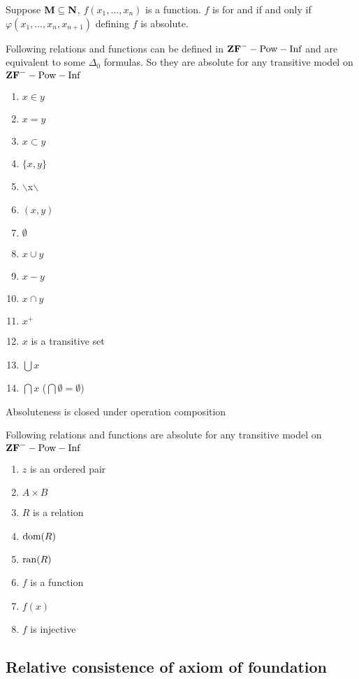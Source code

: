 \documentclass[11pt]{article}
\begin{document}
\begin{definition}[]
Suppose \(\textbf{M}\subseteq\textbf{N}\), \(f(x_1,\dots,x_n)\) is a function. \(f\) is
 for \cm and \cn if and only if \(\varphi(x_1,\dots,x_n,x_{n+1})\)
defining \(f\) is absolute.
\end{definition}

\begin{theorem}[]
Following relations and functions can be defined in
\(\textbf{ZF}^--\text{Pow}-\text{Inf}\) and are equivalent to some \(\Delta_0\) formulas.
So they are absolute for any transitive model \cm on 
\(\textbf{ZF}^--\text{Pow}-\text{Inf}\)
\begin{enumerate}
\item \(x\in y\)
\item \(x=y\)
\item \(x\subset y\)
\item \(\{x,y\}\)
\item $\backslash${x$\backslash$}
\item \((x,y)\)
\item \(\emptyset\)
\item \(x\cup y\)
\item \(x-y\)
\item \(x\cap y\)
\item \(x^+\)
\item \(x\) is a transitive set
\item \(\bigcup x\)
\item \(\bigcap x\) (\(\bigcap\emptyset=\emptyset\))
\end{enumerate}
\end{theorem}

\begin{lemma}[]
Absoluteness is closed under operation composition
\end{lemma}

\begin{theorem}[]
Following relations and functions are absolute for any transitive model \cm on 
\(\textbf{ZF}^--\text{Pow}-\text{Inf}\)
\begin{enumerate}
\item \(z\) is an ordered pair
\item \(A\times B\)
\item \(R\) is a relation
\item \(\mathrm{dom}{(R)}\)
\item \(\mathrm{ran}{(R)}\)
\item \(f\) is a function
\item \(f(x)\)
\item \(f\) is injective
\end{enumerate}
\end{theorem}
\subsection{Relative consistence of axiom of foundation}
\label{sec:orgc151bfe}
\end{document}
